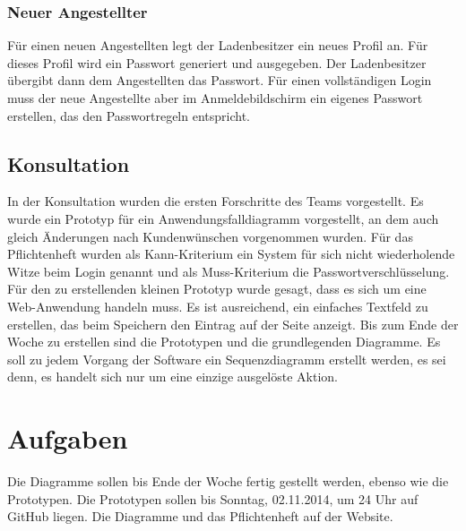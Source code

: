 \documentclass{scrartcl}
\begin{document}
\subsubsection{Neuer Angestellter}
Für einen neuen Angestellten legt der Ladenbesitzer ein neues Profil an. Für dieses Profil wird ein Passwort generiert und ausgegeben. Der Ladenbesitzer übergibt dann dem Angestellten das Passwort. Für einen vollständigen Login muss der neue Angestellte aber im Anmeldebildschirm ein eigenes Passwort erstellen, das den Passwortregeln entspricht.
\subsection{Konsultation}
In der Konsultation wurden die ersten Forschritte des Teams vorgestellt. Es wurde ein Prototyp für ein Anwendungsfalldiagramm
vorgestellt, an dem auch gleich Änderungen nach Kundenwünschen vorgenommen wurden. 
Für das Pflichtenheft wurden 
als Kann-Kriterium ein System für sich nicht wiederholende Witze beim Login genannt und als Muss-Kriterium die
Passwortverschlüsselung. 
Für den zu erstellenden kleinen Prototyp wurde gesagt, dass es sich um eine Web-Anwendung
handeln muss. Es ist ausreichend, ein einfaches Textfeld zu erstellen, das beim Speichern den Eintrag auf der
Seite anzeigt.
Bis zum Ende der Woche zu erstellen sind die Prototypen und die grundlegenden Diagramme. Es soll zu jedem Vorgang
der Software ein Sequenzdiagramm erstellt werden, es sei denn, es handelt sich nur um eine einzige ausgelöste Aktion.

\vspace*{1em}

\section{Aufgaben}
Die Diagramme sollen bis Ende der Woche fertig gestellt werden, ebenso wie die Prototypen. Die Prototypen sollen bis Sonntag, 02.11.2014, um 24 Uhr auf GitHub liegen. Die Diagramme und das Pflichtenheft auf der Website.
\end{document}
